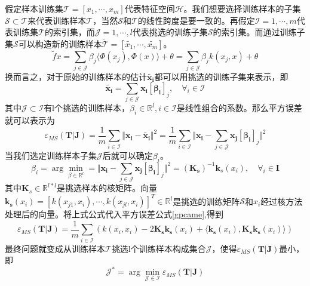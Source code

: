 \documentclass[10pt,a4paper]{article}
\begin{document}
\begin{CJK*}{UTF8}{song}
假定样本训练集$\mathcal{T}=[x_1,\cdots,x_m]$代表特征空间$\mathcal{H}$。我们想要选择训练样本的子集$\mathcal{S} \subset \mathcal{T}$来代表训练样本$\mathcal{T}$，当然$\mathcal{S}$和$\mathcal{T}$的线性跨度是要一致的。再假定$\mathcal{I}={1,\cdots,m}$代表训练集$\mathcal{T}$的索引集，而$\mathcal{J}={1,\cdots,l}$代表挑选的训练子集$\mathcal{S}$的索引集。而通过训练子集$\mathcal{S}$可以构造新的训练样本$\tilde{\mathcal{T}}=[\tilde{x_1},\cdots,\tilde{x_m}]$。
\begin{equation}
\tilde{f}{x}=\sum_{j \in \mathcal{J}} \beta_j\langle \Phi(x_j),\Phi(x) \rangle+\theta
=\sum_{j \in \mathcal{J}} \beta_j k(x_j,x) +\theta
\end{equation}
换而言之，对于原始的训练样本的估计$\tilde{\boldsymbol{x_i}}$都可以用挑选的训练子集来表示，即
\begin{equation}
\tilde{\boldsymbol{x_i}}=\sum_{j \in \mathcal{J}} \boldsymbol{x_i}[\mathbf{\beta_i}]_j, \quad \forall_i \in \mathcal{I}
\end{equation}
其中$\mathcal{J} \subset \mathcal{I}$有l个挑选的训练样本，$\beta_i \in \mathbb{R}^l,i \in \mathcal{I}$是线性组合的系数。那么平方误差就可以表示为
\begin{equation}
\label{gpcame}
\varepsilon_{MS}(\boldsymbol{T}|\boldsymbol{J})=
\frac{1}{m}\sum_{i \in \mathcal{I}}\Vert \boldsymbol{x_i}-\tilde{\boldsymbol{x_i}} \Vert^2
=\frac{1}{m}\sum_{i \in \mathcal{I}}\Vert \boldsymbol{x_i}-\sum_{j \in \mathcal{J}} \boldsymbol{x_j}[\mathbf{\beta_i}]_j \Vert^2
\end{equation}
当我们选定训练样本子集$\mathcal{J}$后就可以确定$\beta_i$。
\begin{equation}
\beta_i=\arg\min_{\beta \in \mathbb{R}^l}
=\Vert \boldsymbol{x_i}-\sum_{j \in \mathcal{J}} \boldsymbol{x_j}[\mathbf{\beta_i}]_j \Vert^2
=(\mathbf{K_s})^{-1}\boldsymbol{k}_s(x_i), \quad \forall_i \in \mathbf{I}
\end{equation}
其中$\mathbf{K}_s \in \mathbb{R}^{l*l}$是挑选样本的核矩阵。向量$\mathbf{k_s}(x_i)=[k(x_{j1},x_i),\cdots,k(x_{jl},x_i)]^T \in \mathbb{R}^l$是挑选的训练矩阵$\mathcal{S}$和$x_i$经过核方法处理后的向量。将上式公式代入平方误差公式\ref{gpcame},得到
\begin{equation}
\varepsilon_{MS}(\boldsymbol{T}|\boldsymbol{J})=
\frac{1}{m}\sum_{i \in \mathcal{I}}(k(x_i,x_i)-2\mathbf{K_s}\boldsymbol{k_s}(x_i)+
\langle \boldsymbol{k_s}(x_i),\mathbf{K_s}\boldsymbol{k_s}(x_i) \rangle)
\end{equation}
最终问题就变成从训练样本$\mathcal{T}$挑选l个训练样本构成集合$\mathcal{J}$，使得$\varepsilon_{MS}(\boldsymbol{T}|\boldsymbol{J})$最小，即
\begin{equation}
\mathcal{J^*}=\arg\min_{\mathcal{J} \in \mathcal{I}}\varepsilon_{MS}(\boldsymbol{T}|\boldsymbol{J})
\end{equation}


\end{CJK*}
\end{document}
